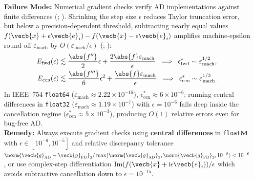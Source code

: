 \documentclass[../../../../master.tex]{subfiles}
\begin{document}
\begin{pitfall}
\textbf{Failure Mode:} Numerical gradient checks verify AD implementations against finite differences (; ). Shrinking the step size $\epsilon$ reduces Taylor truncation error, but below a precision-dependent threshold, subtracting nearly equal values $f(\vecb{x}+\epsilon\vecb{e}_i) - f(\vecb{x}-\epsilon\vecb{e}_i)$ amplifies machine-epsilon round-off $\varepsilon_{\text{mach}}$ by $O(\varepsilon_{\text{mach}}/\epsilon)$ (; ):
\begin{equation}
\begin{aligned}
  E_{\text{fwd}}(\epsilon) &\lesssim \frac{\abs{f''}}{2}\epsilon + \frac{2\abs{f}\varepsilon_{\text{mach}}}{\epsilon}
  \;\implies\; \epsilon^*_{\text{fwd}} \sim \varepsilon_{\text{mach}}^{1/2}, \\
  E_{\text{cen}}(\epsilon) &\lesssim \frac{\abs{f'''}}{6}\epsilon^2 + \frac{\abs{f}\varepsilon_{\text{mach}}}{\epsilon}
  \;\implies\; \epsilon^*_{\text{cen}} \sim \varepsilon_{\text{mach}}^{1/3}.
\end{aligned}
  \label{eq:matcalc:fd_error}
\end{equation}
In IEEE~754 \texttt{float64} ($\varepsilon_{\text{mach}} \approx 2.22 \times 10^{-16}$), $\epsilon^*_{\text{cen}} \approx 6 \times 10^{-6}$; running central differences in \texttt{float32} ($\varepsilon_{\text{mach}} \approx 1.19 \times 10^{-7}$) with $\epsilon = 10^{-6}$ falls deep inside the cancellation regime ($\epsilon^*_{\text{cen}} \approx 5 \times 10^{-3}$), producing $O(1)$ relative errors even for bug-free AD.\\
\textbf{Remedy:} Always execute gradient checks using \textbf{central differences} in \texttt{float64} with $\epsilon \in [10^{-6}, 10^{-5}]$ and relative discrepancy tolerance $\norm{\vecb{g}_{\text{AD}} - \vecb{g}_{\text{FD}}}_2 / \max(\norm{\vecb{g}_{\text{AD}}}_2, \norm{\vecb{g}_{\text{FD}}}_2, 10^{-8}) < 10^{-6}$, or use complex-step differentiation $\mathrm{Im}(f(\vecb{x} + \mathrm{i}\epsilon\vecb{e}_i))/\epsilon$ which avoids subtractive cancellation down to $\epsilon = 10^{-15}$.
\end{pitfall}
\end{document}
